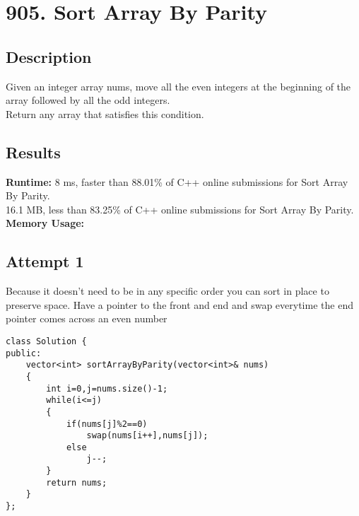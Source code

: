 \chapter{905. Sort Array By Parity}
\section{Description}
Given an integer array nums, move all the even integers at the beginning of the array followed by all the odd integers.
\\
Return any array that satisfies this condition.
\section{Results}
\textbf{Runtime:}
8 ms, faster than 88.01\% of C++ online submissions for Sort Array By Parity.\\
16.1 MB, less than 83.25\% of C++ online submissions for Sort Array By Parity.\\
\textbf{Memory Usage:}
\newpage
\section{Attempt 1}
Because it doesn't need to be in any specific order you can sort in place to preserve space. Have a pointer to the front and end and swap everytime the end pointer comes across an even number
\begin{lstlisting}
class Solution {
public:
    vector<int> sortArrayByParity(vector<int>& nums) 
    {
        int i=0,j=nums.size()-1;
        while(i<=j)
        {
            if(nums[j]%2==0)
                swap(nums[i++],nums[j]);
            else
                j--;
        }
        return nums;
    }
};
\end{lstlisting}
